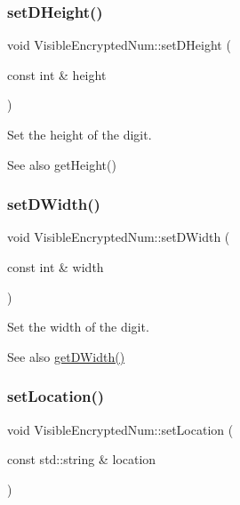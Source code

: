 \subsubsection{\texorpdfstring{set\+D\+Height()}{setDHeight()}}
{\footnotesize\ttfamily void Visible\+Encrypted\+Num\+::set\+D\+Height (\begin{DoxyParamCaption}\item[{const int \&}]{height }\end{DoxyParamCaption})\hspace{0.3cm}{\ttfamily [virtual]}}



Set the height of the digit. 

\begin{DoxySeeAlso}{See also}
get\+Height() 
\end{DoxySeeAlso}
\mbox{\label{class_visible_encrypted_num_a914e70f40d7344355a343dc3db6cba1e}} 
\subsubsection{\texorpdfstring{set\+D\+Width()}{setDWidth()}}
{\footnotesize\ttfamily void Visible\+Encrypted\+Num\+::set\+D\+Width (\begin{DoxyParamCaption}\item[{const int \&}]{width }\end{DoxyParamCaption})\hspace{0.3cm}{\ttfamily [virtual]}}



Set the width of the digit. 

\begin{DoxySeeAlso}{See also}
\mbox{\hyperlink{class_visible_encrypted_num_a252dfa8c0add8c6fa244bdd835f7eed6}{get\+D\+Width()}} 
\end{DoxySeeAlso}
\mbox{\label{class_visible_encrypted_num_a67e9d05edbbb67a3881123e99523f9c1}} 
\subsubsection{\texorpdfstring{set\+Location()}{setLocation()}}
{\footnotesize\ttfamily void Visible\+Encrypted\+Num\+::set\+Location (\begin{DoxyParamCaption}\item[{const std\+::string \&}]{location }\end{DoxyParamCaption})\hspace{0.3cm}{\ttfamily [virtual]}}

